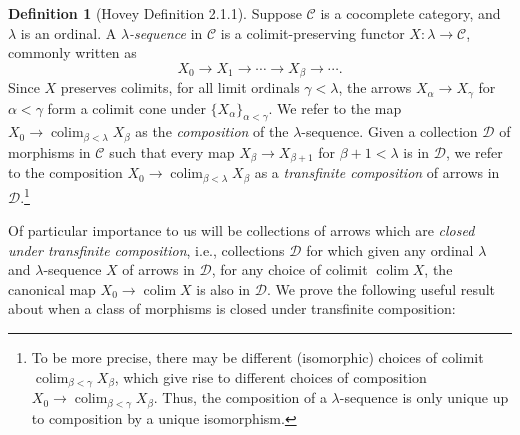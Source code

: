 \documentclass{amsart}
\theoremstyle{plain}
\theoremstyle{definition}
\newtheorem{definition}[theorem]{Definition}
\newcommand{\0}{\mathbf{0}}
\newcommand{\cC}{\mathcal C}
\newcommand{\cD}{\mathcal D}
\renewcommand{\(}{\left(}
\renewcommand{\)}{\right)}
\DeclareMathOperator*{\colim}{colim}
\begin{document}
\begin{definition}[Hovey Definition 2.1.1]
  Suppose $\cC$ is a cocomplete category, and $\lambda$ is an ordinal. A \textit{$\lambda$-sequence} in $\cC$ is a colimit-preserving functor $X:\lambda\to\cC$, commonly written as
  \[X_0\to X_1\to\cdots\to X_\beta\to\cdots.\]
  Since $X$ preserves colimits, for all limit ordinals $\gamma<\lambda$, the arrows $X_\alpha\to X_\gamma$ for $\alpha<\gamma$ form a colimit cone under $\{X_\alpha\}_{\alpha<\gamma}$. We refer to the map $X_0\to \colim_{\beta<\lambda}X_\beta$ as the \textit{composition} of the $\lambda$-sequence. Given a collection $\cD$ of morphisms in $\cC$ such that every map $X_\beta\to X_{\beta+1}$ for $\beta+1<\lambda$ is in $\cD$, we refer to the composition $X_0\to\colim_{\beta<\lambda}X_\beta$ as a \textit{transfinite composition} of arrows in $\cD$.\footnote{To be more precise, there may be different (isomorphic) choices of colimit $\colim_{\beta<\gamma}X_\beta$, which give rise to different choices of composition $X_0\to\colim_{\beta<\gamma}X_\beta$. Thus, the composition of a $\lambda$-sequence is only unique up to composition by a unique isomorphism.}
\end{definition}

Of particular importance to us will be collections of arrows which are \textit{closed under transfinite composition}, i.e., collections $\cD$ for which given any ordinal $\lambda$ and $\lambda$-sequence $X$ of arrows in $\cD$, for any choice of colimit $\colim X$, the canonical map $X_0\to\colim X$ is also in $\cD$. We prove the following useful result about when a class of morphisms is closed under transfinite composition:
\end{document}
